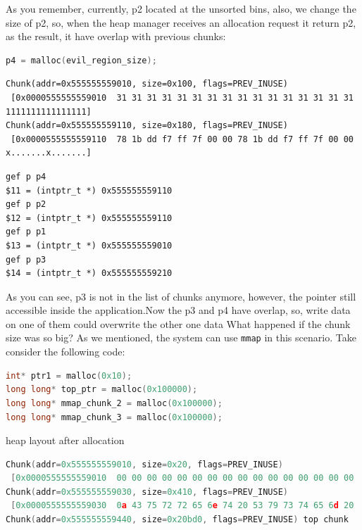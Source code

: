 \documentclass{masterthesis}
\newcommand*\ub{unsorted bins}
\newcommand*\mmapc{\lstinline{mmap}\xspace}
\begin{document}
As you remember, currently, p2 located at the \ub{}, also, we change the size of p2, so, when the heap manager receives an allocation request it return p2, as the result, it have overlap with previous chunks:

\begin{lstlisting}[language=c,frame=tlrb]
p4 = malloc(evil_region_size);
 \end{lstlisting}

\begin{lstlisting}[frame=tlrb]
Chunk(addr=0x555555559010, size=0x100, flags=PREV_INUSE)
 [0x0000555555559010  31 31 31 31 31 31 31 31 31 31 31 31 31 31 31 31 1111111111111111]
Chunk(addr=0x555555559110, size=0x180, flags=PREV_INUSE)
 [0x0000555555559110  78 1b dd f7 ff 7f 00 00 78 1b dd f7 ff 7f 00 00 x.......x.......]
\end{lstlisting}

\begin{lstlisting}[frame=tlrb]
gef p p4
$11 = (intptr_t *) 0x555555559110
gef p p2
$12 = (intptr_t *) 0x555555559110
gef p p1
$13 = (intptr_t *) 0x555555559010
gef p p3
$14 = (intptr_t *) 0x555555559210
\end{lstlisting}

As you can see, p3 is not in the list of chunks anymore, however, the pointer still accessible inside the application.Now the p3 and p4 have overlap, so, write data on one of them could overwrite the other one data
What happened if the chunk size was so big? As we mentioned, the system can use \mmapc{} in this scenario. Take consider the following code:

\begin{lstlisting}[language=c,frame=tlrb]
int* ptr1 = malloc(0x10);
long long* top_ptr = malloc(0x100000);
long long* mmap_chunk_2 = malloc(0x100000);
long long* mmap_chunk_3 = malloc(0x100000);
\end{lstlisting}

heap layout after allocation

\begin{lstlisting}[language=c,frame=tlrb]
Chunk(addr=0x555555559010, size=0x20, flags=PREV_INUSE)
 [0x0000555555559010  00 00 00 00 00 00 00 00 00 00 00 00 00 00 00 00 ................]
Chunk(addr=0x555555559030, size=0x410, flags=PREV_INUSE)
 [0x0000555555559030  0a 43 75 72 72 65 6e 74 20 53 79 73 74 65 6d 20 .Current System ]
Chunk(addr=0x555555559440, size=0x20bd0, flags=PREV_INUSE) top chunk
\end{lstlisting}
\end{document}
